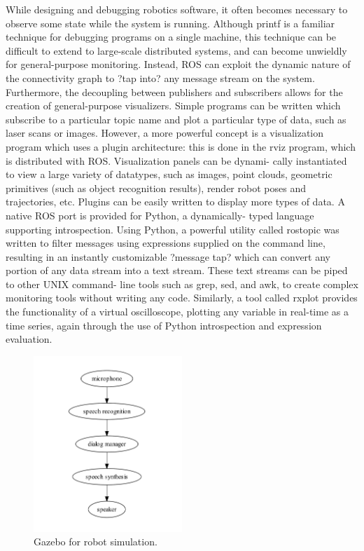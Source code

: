 While designing and debugging robotics software, it often becomes necessary to observe some state while the system is running. Although printf is a familiar technique for debugging programs on a single machine, this technique can be difficult to extend to large-scale distributed systems, and can become unwieldly for general-purpose monitoring.
Instead, ROS can exploit the dynamic nature of the connectivity graph to ?tap into? any message stream on the system. Furthermore, the decoupling between publishers and subscribers allows for the creation of general-purpose visualizers. Simple programs can be written which subscribe to a particular topic name and plot a particular type of data, such as laser scans or images. However, a more powerful concept is a visualization program which uses a plugin architecture: this is done in the rviz program, which is distributed with ROS. Visualization panels can be dynami- cally instantiated to view a large variety of datatypes, such as images, point clouds, geometric primitives (such as object recognition results), render robot poses and trajectories, etc. Plugins can be easily written to display more types of data.
A native ROS port is provided for Python, a dynamically- typed language supporting introspection. Using Python, a powerful utility called rostopic was written to filter messages using expressions supplied on the command line, resulting in an instantly customizable ?message tap? which can convert any portion of any data stream into a text stream. These text streams can be piped to other UNIX command- line tools such as grep, sed, and awk, to create complex monitoring tools without writing any code.
Similarly, a tool called rxplot provides the functionality of a virtual oscilloscope, plotting any variable in real-time as a time series, again through the use of Python introspection and expression evaluation.

\begin{figure}[h]
\centering
\includegraphics[width=0.5\textwidth]{figs/ch2/ros-pipeline}
\caption{Gazebo for robot simulation.}
\end{figure}

